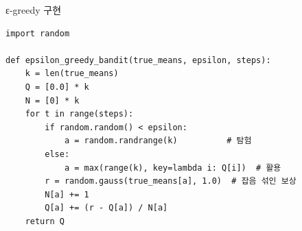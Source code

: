 \begin{frame}[fragile]{ε-greedy 구현}
\begin{lstlisting}
import random

def epsilon_greedy_bandit(true_means, epsilon, steps):
    k = len(true_means)
    Q = [0.0] * k
    N = [0] * k
    for t in range(steps):
        if random.random() < epsilon:
            a = random.randrange(k)          # 탐험
        else:
            a = max(range(k), key=lambda i: Q[i])  # 활용
        r = random.gauss(true_means[a], 1.0)  # 잡음 섞인 보상
        N[a] += 1
        Q[a] += (r - Q[a]) / N[a]
    return Q
\end{lstlisting}
\end{frame}
